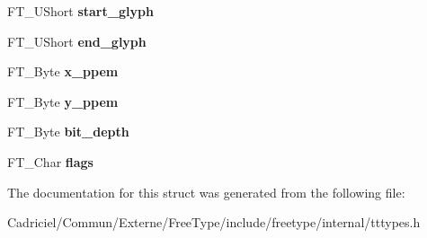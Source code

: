 \begin{DoxyCompactItemize}
\item 
F\+T\+\_\+\+U\+Short {\bfseries start\+\_\+glyph}\hypertarget{struct_t_t___s_bit___strike_rec___a05032d4092eef7e7214bb82d4113d8b9}{}\label{struct_t_t___s_bit___strike_rec___a05032d4092eef7e7214bb82d4113d8b9}

\item 
F\+T\+\_\+\+U\+Short {\bfseries end\+\_\+glyph}\hypertarget{struct_t_t___s_bit___strike_rec___a1af21e0ef936193b22575ea75bad487f}{}\label{struct_t_t___s_bit___strike_rec___a1af21e0ef936193b22575ea75bad487f}

\item 
F\+T\+\_\+\+Byte {\bfseries x\+\_\+ppem}\hypertarget{struct_t_t___s_bit___strike_rec___a2a1b17c24df2084fe485aefe8f34e7d4}{}\label{struct_t_t___s_bit___strike_rec___a2a1b17c24df2084fe485aefe8f34e7d4}

\item 
F\+T\+\_\+\+Byte {\bfseries y\+\_\+ppem}\hypertarget{struct_t_t___s_bit___strike_rec___ad618814b841b86e7763f1aa371e04fed}{}\label{struct_t_t___s_bit___strike_rec___ad618814b841b86e7763f1aa371e04fed}

\item 
F\+T\+\_\+\+Byte {\bfseries bit\+\_\+depth}\hypertarget{struct_t_t___s_bit___strike_rec___ac57b360af4620bd06251d098f5da23bb}{}\label{struct_t_t___s_bit___strike_rec___ac57b360af4620bd06251d098f5da23bb}

\item 
F\+T\+\_\+\+Char {\bfseries flags}\hypertarget{struct_t_t___s_bit___strike_rec___a38735f8c00b23deb25ffab798c0aa7b7}{}\label{struct_t_t___s_bit___strike_rec___a38735f8c00b23deb25ffab798c0aa7b7}

\end{DoxyCompactItemize}


The documentation for this struct was generated from the following file\+:\begin{DoxyCompactItemize}
\item 
Cadriciel/\+Commun/\+Externe/\+Free\+Type/include/freetype/internal/tttypes.\+h\end{DoxyCompactItemize}
